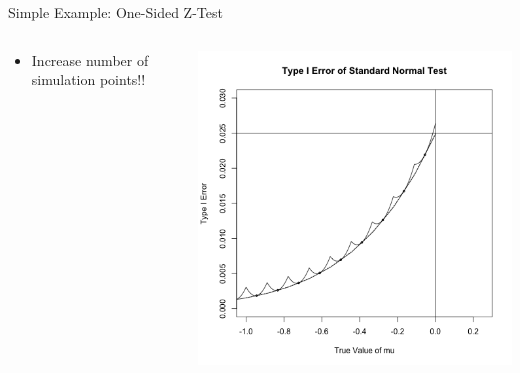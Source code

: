 \begin{frame}{Simple Example: One-Sided Z-Test}
\begin{columns}
\begin{column}{.3\textwidth}
\begin{itemize}
\item Increase number of simulation points!!
\end{itemize}
\end{column}

\begin{column}{.7\textwidth}
\includegraphics[width=\textwidth]{figures/z-test-10.png}
\end{column}
\end{columns}
\end{frame}

